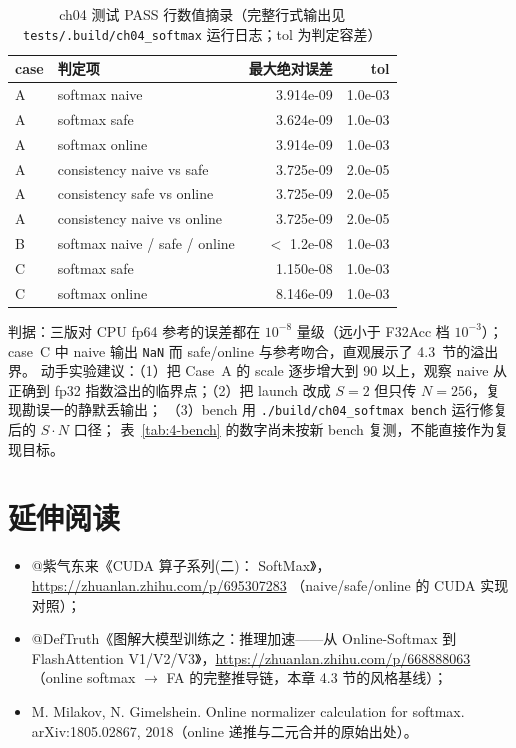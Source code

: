 \begin{table}[htbp]
\centering
\caption{ch04 测试 PASS 行数值摘录（完整行式输出见
\texttt{tests/\allowbreak{}.\allowbreak{}build/\allowbreak{}ch04\_\allowbreak{}softmax} 运行日志；tol 为判定容差）}
\label{tab:4-pass}
\begin{tabular}{llrr}
\toprule
case & 判定项 & 最大绝对误差 & tol \\
\midrule
A & softmax naive           & 3.914e-09 & 1.0e-03 \\
A & softmax safe            & 3.624e-09 & 1.0e-03 \\
A & softmax online          & 3.914e-09 & 1.0e-03 \\
A & consistency naive vs safe  & 3.725e-09 & 2.0e-05 \\
A & consistency safe vs online & 3.725e-09 & 2.0e-05 \\
A & consistency naive vs online & 3.725e-09 & 2.0e-05 \\
B & softmax naive / safe / online & $<$ 1.2e-08 & 1.0e-03 \\
C & softmax safe            & 1.150e-08 & 1.0e-03 \\
C & softmax online          & 8.146e-09 & 1.0e-03 \\
\bottomrule
\end{tabular}
\end{table}

判据：三版对 CPU fp64 参考的误差都在 $10^{-8}$ 量级（远小于 F32Acc 档 $10^{-3}$）；
case~C 中 naive 输出 \texttt{NaN} 而 safe/online 与参考吻合，直观展示了 4.3~节的溢出界。
动手实验建议：（1）把 Case~A 的 scale 逐步增大到 90 以上，观察 naive 从正确到
fp32 指数溢出的临界点；（2）把 launch 改成 $S=2$ 但只传 $N=256$，复现勘误一的静默丢输出；
（3）bench 用 \texttt{.\allowbreak{}/\allowbreak{}build/\allowbreak{}ch04\_\allowbreak{}softmax bench} 运行修复后的 $S\cdot N$ 口径；
表~\ref{tab:4-bench} 的数字尚未按新 bench 复测，不能直接作为复现目标。

\section*{延伸阅读}

\begin{itemize}
  \item @紫气东来《CUDA 算子系列(二)： SoftMax》，
        \url{https://zhuanlan.zhihu.com/p/695307283}
        （naive/safe/online 的 CUDA 实现对照）；
  \item @DefTruth《图解大模型训练之：推理加速——从 Online-Softmax 到 FlashAttention
        V1/V2/V3》，\url{https://zhuanlan.zhihu.com/p/668888063}
        （online softmax $\to$ FA 的完整推导链，本章 4.3 节的风格基线）；
  \item M. Milakov, N. Gimelshein. Online normalizer calculation for softmax.
        arXiv:1805.02867, 2018（online 递推与二元合并的原始出处）。
\end{itemize}
